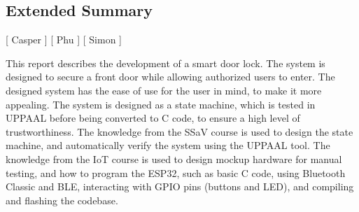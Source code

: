 \subsection*{Extended Summary}
[ Casper ] [ Phu ] [ Simon ] 
\newline

This report describes the development of a smart door lock.
The system is designed to secure a front door while allowing authorized users to enter.
The designed system has the ease of use for the user in mind, to make it more appealing.
The system is designed as a state machine, which is tested in UPPAAL before being converted to C code, to ensure a high level of trustworthiness.
The knowledge from the SSaV course is used to design the state machine, and automatically verify the system using the UPPAAL tool.
The knowledge from the IoT course is used to design mockup hardware for manual testing, and how to program the ESP32, such as basic C code, using Bluetooth Classic and BLE, interacting with GPIO pins (buttons and LED), and compiling and flashing the codebase.